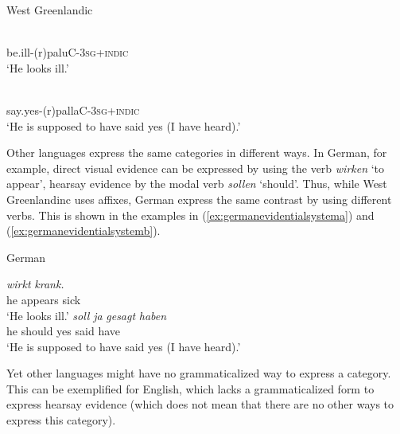 \begin{exe}
\ex West Greenlandic \citep[294--295]{fortescue2003evidentiality} \begin{xlist}
\ex {} \\
{be.ill-(r)paluC-\textsc{3sg}+\textsc{indic}} \\
\trans `He looks ill.' \label{ex:westgreenlandicevidential}

\ex {} \\
{say.yes-(r)pallaC-\textsc{3sg}+\textsc{indic}} \\
\trans `He is supposed to have said yes (I have heard).' \label{ex:westgreenlandicevidentialb}

\end{xlist}
\end{exe} 

\noindent Other languages express the same categories in different ways. In German, for example, direct visual evidence can be expressed by using the verb \textit{wirken} `to appear', hearsay evidence by the modal verb \textit{sollen} `should'. Thus, while West Greenlandinc uses affixes, German express the same contrast by using different verbs.  This is shown in the examples in (\ref{ex:germanevidentialsystema}) and (\ref{ex:germanevidentialsystemb}). 

\begin{exe}
\ex German\begin{xlist}
\ex {} {\textit{wirkt}} {\textit{krank.}} \\
{he} {appears} {sick} \\
\trans `He looks ill.' \label{ex:germanevidentialsystema}
\ex {} {\textit{soll}} {\textit{ja}} {\textit{gesagt}} {\textit{haben}} \\
{he} {should} {yes} {said} {have} \\
\trans `He is supposed to have said yes (I have heard).' \label{ex:germanevidentialsystemb}
\end{xlist}
\end{exe} 

\noindent Yet other languages might have no grammaticalized way to express a category. This can be exemplified for English, which lacks a grammaticalized form to express hearsay evidence (which does not mean that there are no other ways to express this category). 

